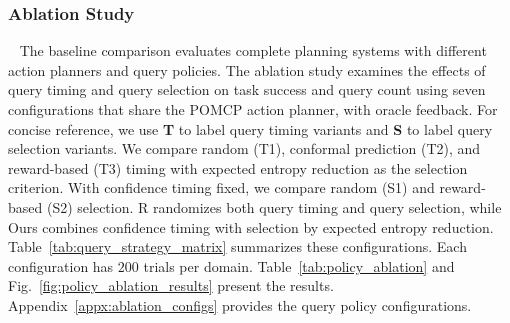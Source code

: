 % 

\subsubsection{Ablation Study}~\label{exp:when_what_random}\label{exp:policy_ablation}
The baseline comparison evaluates complete planning systems with different action planners and query policies. The ablation study examines the effects of query timing and query selection on task success and query count using seven configurations that share the POMCP action planner, with oracle feedback. For concise reference, we use \textbf{T} to label query timing variants and \textbf{S} to label query selection variants. We compare random (T1), conformal prediction (T2), and reward-based (T3) timing with expected entropy reduction as the selection criterion. With confidence timing fixed, we compare random (S1) and reward-based (S2) selection. R randomizes both query timing and query selection, while Ours combines confidence timing with selection by expected entropy reduction. Table~\ref{tab:query_strategy_matrix} summarizes these configurations. Each configuration has $200$ trials per domain. Table~\ref{tab:policy_ablation} and Fig.~\ref{fig:policy_ablation_results} present the results. Appendix~\ref{appx:ablation_configs} provides the query policy configurations.

